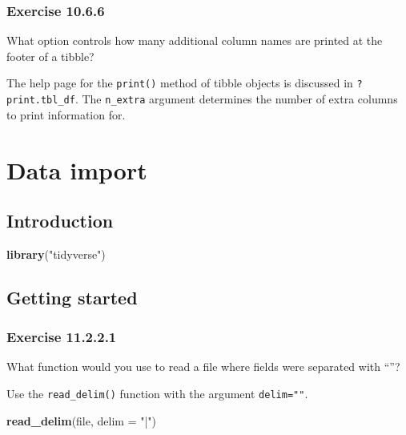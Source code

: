 \documentclass[]{book}
\newenvironment{Shaded}{\begin{snugshade}}{\end{snugshade}}
\newcommand{\DataTypeTok}[1]{\textcolor[rgb]{0.13,0.29,0.53}{#1}}
\newcommand{\KeywordTok}[1]{\textcolor[rgb]{0.13,0.29,0.53}{\textbf{#1}}}
\newcommand{\NormalTok}[1]{#1}
\newcommand{\StringTok}[1]{\textcolor[rgb]{0.31,0.60,0.02}{#1}}
\theoremstyle{plain}
\theoremstyle{remark}
\begin{document}
\hypertarget{exercise-10.6.6}{%
\subsection*{\texorpdfstring{Exercise
{10.6.6}}{Exercise 10.6.6}}\label{exercise-10.6.6}}

What option controls how many additional column names are printed at the
footer of a tibble?

The help page for the \texttt{print()} method of tibble objects is
discussed in \texttt{?print.tbl\_df}. The \texttt{n\_extra} argument
determines the number of extra columns to print information for.

\hypertarget{data-import}{%
\chapter{Data import}\label{data-import}}

\hypertarget{introduction-6}{%
\section{Introduction}\label{introduction-6}}

\begin{Shaded}
\begin{Highlighting}[]
\KeywordTok{library}\NormalTok{(}\StringTok{"tidyverse"}\NormalTok{)}
\end{Highlighting}
\end{Shaded}

\hypertarget{getting-started}{%
\section{Getting started}\label{getting-started}}

\hypertarget{exercise-11.2.2.1}{%
\subsection*{\texorpdfstring{Exercise
{11.2.2.1}}{Exercise 11.2.2.1}}\label{exercise-11.2.2.1}}

What function would you use to read a file where fields were separated
with ``\textbar{}''?

Use the \texttt{read\_delim()} function with the argument
\texttt{delim="\textbar{}"}.

\begin{Shaded}
\begin{Highlighting}[]
\KeywordTok{read_delim}\NormalTok{(file, }\DataTypeTok{delim =} \StringTok{"|"}\NormalTok{)}
\end{Highlighting}
\end{Shaded}
\end{document}
